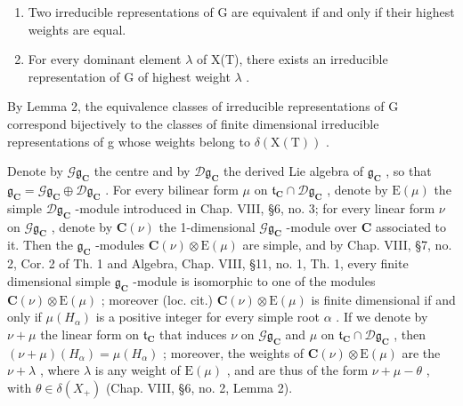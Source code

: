 \begin{enumerate}
\def\labelenumi{\alph{enumi})}
\setcounter{enumi}{1}
\item
  Two irreducible representations of G are equivalent if and only if their highest weights are equal.
\item
  For every dominant element \(\lambda\) of X(T), there exists an irreducible representation of G of highest weight \(\lambda\) .
\end{enumerate}

By Lemma 2, the equivalence classes of irreducible representations of G correspond bijectively to the classes of finite dimensional irreducible representations of g whose weights belong to \(\delta(\mathrm{X}(\mathrm{T}))\) .

Denote by \(\mathcal{G}\mathfrak{g}_{\mathbf{C}}\) the centre and by \(\mathcal{D}\mathfrak{g}_{\mathbf{C}}\) the derived Lie algebra of \(\mathfrak{g}_{\mathbf{C}}\) , so that \(\mathfrak{g}_{\mathbf{C}} = \mathcal{G}\mathfrak{g}_{\mathbf{C}} \oplus \mathcal{D}\mathfrak{g}_{\mathbf{C}}\) . For every bilinear form \(\mu\) on \(\mathfrak{t}_{\mathbf{C}} \cap \mathcal{D}\mathfrak{g}_{\mathbf{C}}\) , denote by \(\mathrm{E}(\mu)\) the simple \(\mathcal{D}\mathfrak{g}_{\mathbf{C}}\) -module introduced in Chap. VIII, §6, no. 3; for every linear form \(\nu\) on \(\mathcal{G}\mathfrak{g}_{\mathbf{C}}\) , denote by \(\mathbf{C}(\nu)\) the 1-dimensional \(\mathcal{G}\mathfrak{g}_{\mathbf{C}}\) -module over \(\mathbf{C}\) associated to it. Then the \(\mathfrak{g}_{\mathbf{C}}\) -modules \(\mathbf{C}(\nu) \otimes \mathrm{E}(\mu)\) are simple, and by Chap. VIII, §7, no. 2, Cor. 2 of Th. 1 and Algebra, Chap. VIII, §11, no. 1, Th. 1, every finite dimensional simple \(\mathfrak{g}_{\mathbf{C}}\) -module is isomorphic to one of the modules \(\mathbf{C}(\nu) \otimes \mathrm{E}(\mu)\) ; moreover (loc. cit.) \(\mathbf{C}(\nu) \otimes \mathrm{E}(\mu)\) is finite dimensional if and only if \(\mu(H_{\alpha})\) is a positive integer for every simple root \(\alpha\) . If we denote by \(\nu + \mu\) the linear form on \(\mathfrak{t}_{\mathbf{C}}\) that induces \(\nu\) on \(\mathcal{G}\mathfrak{g}_{\mathbf{C}}\) and \(\mu\) on \(\mathfrak{t}_{\mathbf{C}} \cap \mathcal{D}\mathfrak{g}_{\mathbf{C}}\) , then \((\nu + \mu)(H_{\alpha}) = \mu(H_{\alpha})\) ; moreover, the weights of \(\mathbf{C}(\nu) \otimes \mathrm{E}(\mu)\) are the \(\nu + \lambda\) , where \(\lambda\) is any weight of \(\mathrm{E}(\mu)\) , and are thus of the form \(\nu + \mu - \theta\) , with \(\theta \in \delta(X_{+})\) (Chap. VIII, §6, no. 2, Lemma 2).

